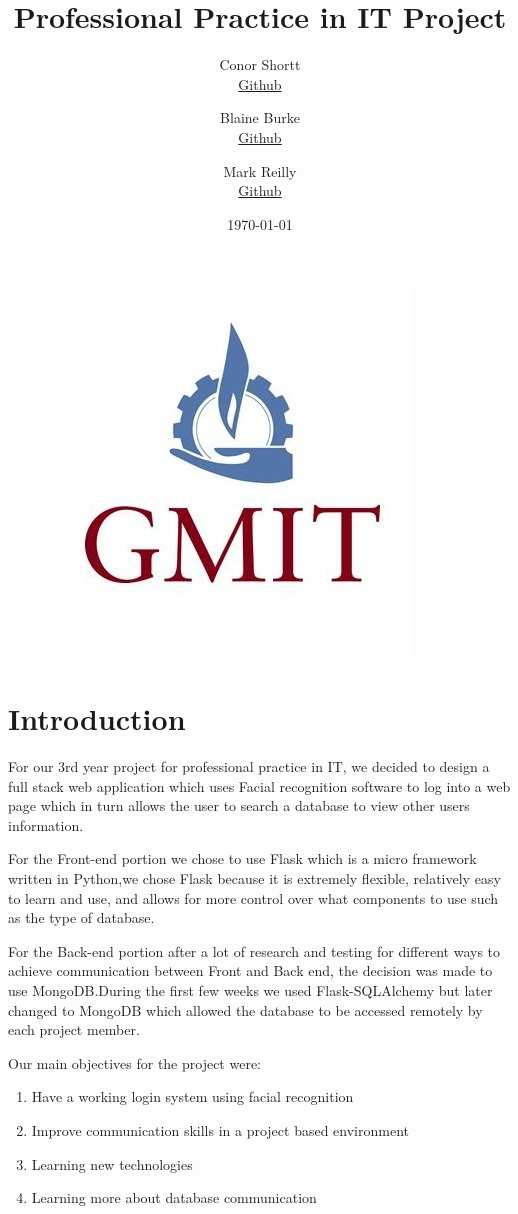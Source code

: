 \documentclass{article}
\title{Professional Practice in IT Project}
\author{
  Conor Shortt\\
  \href{https://github.com/conorshortt123}{Github}
  \and
  Blaine Burke\\
  \href{https://github.com/BurkeBlaine1999}{Github}
  \and
  Mark Reilly\\
  \href{https://github.com/MarkReillyGMIT}{Github}
}
\date{\today}
\begin{document}
\begin{figure}
    \centering
    \includegraphics[scale=0.3]{./images/gmit.jpg}
\end{figure}

\maketitle


\tableofcontents
\newpage


\section{Introduction}
For our 3rd year project for professional practice in IT, we decided to design a full stack web application which uses Facial recognition software\cite{ageitgey} to log into a web page which
in turn allows the user to search a database to view other users information.\medskip

For the Front-end portion we chose to use Flask which is a micro framework written in Python,we chose Flask because it is extremely flexible, relatively easy to learn and use, and allows for more control over what components to use such as the type of database.\medskip

For the Back-end portion after a lot of research and testing for different ways to achieve communication between Front and Back end, the decision was made to use MongoDB.During the first few weeks we used Flask-SQLAlchemy but later changed to MongoDB which allowed the database to be accessed remotely by each project member.\medskip

Our main objectives for the project were:
\begin{enumerate}
\item Have a working login system using facial recognition
\item Improve communication skills in a project based environment 
\item Learning new technologies
\item Learning more about database communication
\end{enumerate}
\end{document}
